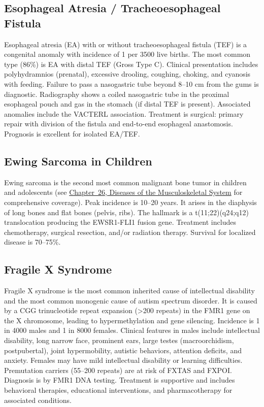 \subsection{Esophageal Atresia / Tracheoesophageal Fistula}
\label{sec:Esophageal Atresia}
Esophageal atresia (EA) with or without tracheoesophageal fistula (TEF) is a congenital anomaly with incidence of 1 per 3500 live births. The most common type (86\%) is EA with distal TEF (Gross Type C). Clinical presentation includes polyhydramnios (prenatal), excessive drooling, coughing, choking, and cyanosis with feeding. Failure to pass a nasogastric tube beyond 8--10 cm from the gums is diagnostic. Radiography shows a coiled nasogastric tube in the proximal esophageal pouch and gas in the stomach (if distal TEF is present). Associated anomalies include the VACTERL association. Treatment is surgical: primary repair with division of the fistula and end-to-end esophageal anastomosis. Prognosis is excellent for isolated EA/TEF.

\subsection{Ewing Sarcoma in Children}
\label{sec:Ewing Sarcoma in Children}
Ewing sarcoma is the second most common malignant bone tumor in children and adolescents (see \hyperref[ch:bones]{Chapter~26, Diseases of the Musculoskeletal System} for comprehensive coverage). Peak incidence is 10--20 years. It arises in the diaphysis of long bones and flat bones (pelvis, ribs). The hallmark is a t(11;22)(q24;q12) translocation producing the EWSR1-FLI1 fusion gene. Treatment includes chemotherapy, surgical resection, and/or radiation therapy. Survival for localized disease is 70--75\%.

\subsection{Fragile X Syndrome}
\label{sec:Fragile X Syndrome}
Fragile X syndrome is the most common inherited cause of intellectual disability and the most common monogenic cause of autism spectrum disorder. It is caused by a CGG trinucleotide repeat expansion (>200 repeats) in the FMR1 gene on the X chromosome, leading to hypermethylation and gene silencing. Incidence is 1 in 4000 males and 1 in 8000 females. Clinical features in males include intellectual disability, long narrow face, prominent ears, large testes (macroorchidism, postpubertal), joint hypermobility, autistic behaviors, attention deficits, and anxiety. Females may have mild intellectual disability or learning difficulties. Premutation carriers (55--200 repeats) are at risk of FXTAS and FXPOI. Diagnosis is by FMR1 DNA testing. Treatment is supportive and includes behavioral therapies, educational interventions, and pharmacotherapy for associated conditions.


